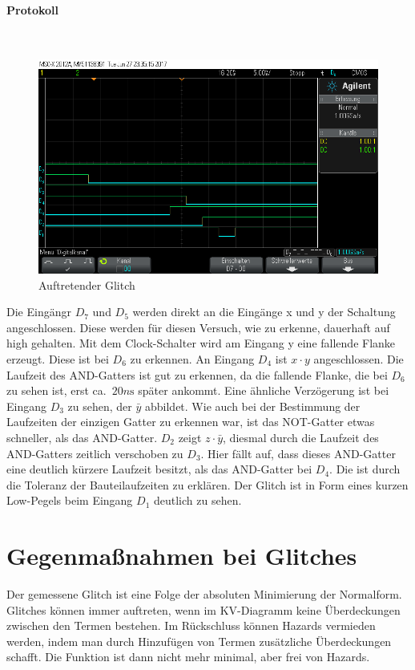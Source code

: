 \documentclass[10pt]{scrreprt}
\begin{document}
    \paragraph{Protokoll}
    $ $
    \begin{figure}[H]
        \includegraphics[width=\textwidth]{scope_12.png}
        \caption{Auftretender Glitch}
    \end{figure}

    Die Eingängr $D_7$ und $D_5$ werden direkt an die Eingänge x und y der Schaltung
    angeschlossen. Diese werden für diesen Versuch, wie zu erkenne, dauerhaft auf
    high gehalten. Mit dem Clock-Schalter wird am Eingang y eine fallende Flanke
    erzeugt. Diese ist bei $D_6$ zu erkennen. An Eingang $D_4$ ist $x \cdot y$
    angeschlossen. Die Laufzeit des AND-Gatters ist gut zu erkennen, da die fallende
    Flanke, die bei $D_6$ zu sehen ist, erst ca.~$20\si{n\second}$ später ankommt.
    Eine ähnliche Verzögerung ist bei Eingang $D_3$ zu sehen, der $\bar{y}$ abbildet.
    Wie auch bei der Bestimmung der Laufzeiten der einzigen Gatter zu erkennen war,
    ist das NOT-Gatter etwas schneller, als das AND-Gatter.
    $D_2$ zeigt $z \cdot \bar{y}$, diesmal durch die Laufzeit des AND-Gatters
    zeitlich verschoben zu $D_3$. Hier fällt auf, dass dieses AND-Gatter eine
    deutlich kürzere Laufzeit besitzt, als das AND-Gatter bei $D_4$. Die ist durch
    die Toleranz der Bauteilaufzeiten zu erklären.
    Der Glitch ist in Form eines kurzen Low-Pegels beim Eingang $D_1$ deutlich
    zu sehen.

    \section{Gegenmaßnahmen bei Glitches}
    Der gemessene Glitch ist eine Folge der absoluten Minimierung der Normalform. Glitches
    können immer auftreten, wenn im KV-Diagramm keine Überdeckungen zwischen den
    Termen bestehen. Im Rückschluss können Hazards vermieden werden, indem man durch
    Hinzufügen von Termen zusätzliche Überdeckungen schafft. Die Funktion ist dann nicht
    mehr minimal, aber frei von Hazards.
\end{document}
